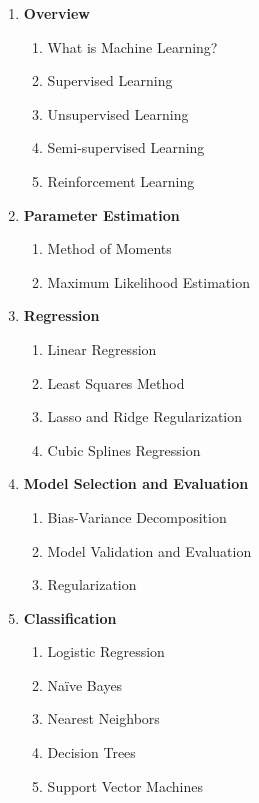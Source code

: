 \documentclass[a4paper,10pt]{article}
\begin{document}
\begin{enumerate}[label=\Roman*.]
    \item \textbf{Overview}
    \begin{enumerate}[label=\alph*.]
        \item What is Machine Learning?
        \item Supervised Learning
        \item Unsupervised Learning
        \item Semi-supervised Learning
        \item Reinforcement Learning
    \end{enumerate}

    \item \textbf{Parameter Estimation}
    \begin{enumerate}[label=\alph*.]
        \item Method of Moments
        \item Maximum Likelihood Estimation
    \end{enumerate}

    \item \textbf{Regression}
    \begin{enumerate}[label=\alph*.]
        \item Linear Regression
        \item Least Squares Method
        \item Lasso and Ridge Regularization
        \item Cubic Splines Regression
    \end{enumerate}

    \item \textbf{Model Selection and Evaluation}
    \begin{enumerate}[label=\alph*.]
        \item Bias-Variance Decomposition
        \item Model Validation and Evaluation
        \item Regularization
    \end{enumerate}

    \item \textbf{Classification}
    \begin{enumerate}[label=\alph*.]
        \item Logistic Regression
        \item Naïve Bayes
        \item Nearest Neighbors
        \item Decision Trees
        \item Support Vector Machines
    \end{enumerate}


\end{enumerate}
\end{document}
